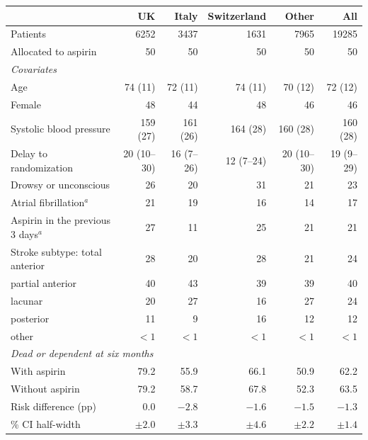\begin{tabular}{lrrrrr}
\hline
 & UK & Italy & Switzerland & Other & All \\
\hline
Patients & 6252 & 3437 & 1631 & 7965 & 19285 \\
Allocated to aspirin & 50 & 50 & 50 & 50 & 50 \\[3pt]
\multicolumn{6}{l}{\textit{Covariates}} \\
Age & 74 (11) & 72 (11) & 74 (11) & 70 (12) & 72 (12) \\
Female & 48 & 44 & 48 & 46 & 46 \\
Systolic blood pressure & 159 (27) & 161 (26) & 164 (28) & 160 (28) & 160 (28) \\
Delay to randomization & 20 (10--30) & 16 (7--26) & 12 (7--24) & 20 (10--30) & 19 (9--29) \\
Drowsy or unconscious & 26 & 20 & 31 & 21 & 23 \\
Atrial fibrillation$^a$ & 21 & 19 & 16 & 14 & 17 \\
Aspirin in the previous 3 days$^a$ & 27 & 11 & 25 & 21 & 21 \\
Stroke subtype: total anterior & 28 & 20 & 28 & 21 & 24 \\
\quad partial anterior & 40 & 43 & 39 & 39 & 40 \\
\quad lacunar & 20 & 27 & 16 & 27 & 24 \\
\quad posterior & 11 & 9 & 16 & 12 & 12 \\
\quad other & $<1$ & $<1$ & $<1$ & $<1$ & $<1$ \\[3pt]
\multicolumn{6}{l}{\textit{Dead or dependent at six months}} \\
With aspirin & 79.2 & 55.9 & 66.1 & 50.9 & 62.2 \\
Without aspirin & 79.2 & 58.7 & 67.8 & 52.3 & 63.5 \\
Risk difference (pp) & $0.0$ & $-2.8$ & $-1.6$ & $-1.5$ & $-1.3$ \\
\quad 95\% CI half-width & $\pm2.0$ & $\pm3.3$ & $\pm4.6$ & $\pm2.2$ & $\pm1.4$ \\
\hline
\end{tabular}
